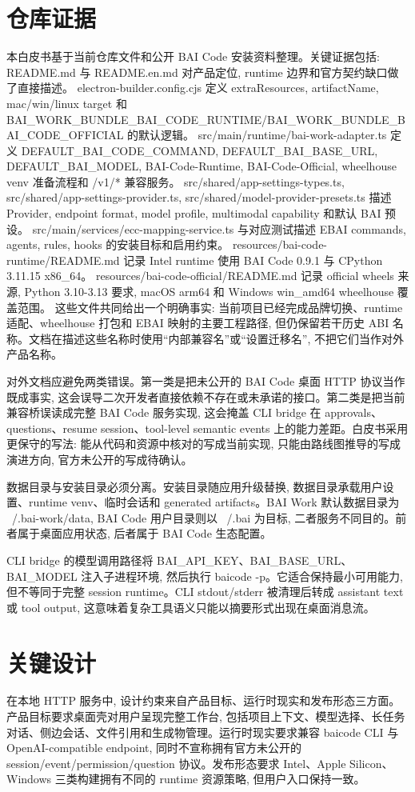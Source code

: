\section{仓库证据}
本白皮书基于当前仓库文件和公开 BAI Code 安装资料整理。关键证据包括: README.md 与 README.en.md 对产品定位, runtime 边界和官方契约缺口做了直接描述。 electron-builder.config.cjs 定义 extraResources, artifactName, mac/win/linux target 和 BAI\_WORK\_BUNDLE\_BAI\_CODE\_RUNTIME/BAI\_WORK\_BUNDLE\_BAI\_CODE\_OFFICIAL 的默认逻辑。 src/main/runtime/bai-work-adapter.ts 定义 DEFAULT\_BAI\_CODE\_COMMAND, DEFAULT\_BAI\_BASE\_URL, DEFAULT\_BAI\_MODEL, BAI-Code-Runtime, BAI-Code-Official, wheelhouse venv 准备流程和 /v1/* 兼容服务。 src/shared/app-settings-types.ts, src/shared/app-settings-provider.ts, src/shared/model-provider-presets.ts 描述 Provider, endpoint format, model profile, multimodal capability 和默认 BAI 预设。 src/main/services/ecc-mapping-service.ts 与对应测试描述 EBAI commands, agents, rules, hooks 的安装目标和启用约束。 resources/bai-code-runtime/README.md 记录 Intel runtime 使用 BAI Code 0.9.1 与 CPython 3.11.15 x86\_64。 resources/bai-code-official/README.md 记录 official wheels 来源, Python 3.10-3.13 要求, macOS arm64 和 Windows win\_amd64 wheelhouse 覆盖范围。 这些文件共同给出一个明确事实: 当前项目已经完成品牌切换、runtime 适配、wheelhouse 打包和 EBAI 映射的主要工程路径, 但仍保留若干历史 ABI 名称。文档在描述这些名称时使用“内部兼容名”或“设置迁移名”, 不把它们当作对外产品名称。

对外文档应避免两类错误。第一类是把未公开的 BAI Code 桌面 HTTP 协议当作既成事实, 这会误导二次开发者直接依赖不存在或未承诺的接口。第二类是把当前兼容桥误读成完整 BAI Code 服务实现, 这会掩盖 CLI bridge 在 approvals、questions、resume session、tool-level semantic events 上的能力差距。白皮书采用更保守的写法: 能从代码和资源中核对的写成当前实现, 只能由路线图推导的写成演进方向, 官方未公开的写成待确认。

数据目录与安装目录必须分离。安装目录随应用升级替换, 数据目录承载用户设置、runtime venv、临时会话和 generated artifacts。BAI Work 默认数据目录为 ~/.bai-work/data, BAI Code 用户目录则以 ~/.bai 为目标, 二者服务不同目的。前者属于桌面应用状态, 后者属于 BAI Code 生态配置。

CLI bridge 的模型调用路径将 BAI\_API\_KEY、BAI\_BASE\_URL、BAI\_MODEL 注入子进程环境, 然后执行 baicode -p。它适合保持最小可用能力, 但不等同于完整 session runtime。CLI stdout/stderr 被清理后转成 assistant text 或 tool output, 这意味着复杂工具语义只能以摘要形式出现在桌面消息流。

\section{关键设计}
在本地 HTTP 服务中, 设计约束来自产品目标、运行时现实和发布形态三方面。产品目标要求桌面壳对用户呈现完整工作台, 包括项目上下文、模型选择、长任务对话、侧边会话、文件引用和生成物管理。运行时现实要求兼容 baicode CLI 与 OpenAI-compatible endpoint, 同时不宣称拥有官方未公开的 session/event/permission/question 协议。发布形态要求 Intel、Apple Silicon、Windows 三类构建拥有不同的 runtime 资源策略, 但用户入口保持一致。

